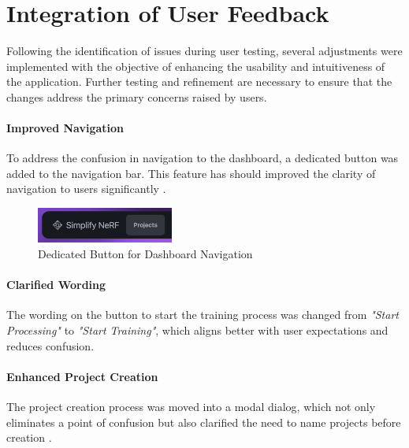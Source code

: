 \section{Integration of User Feedback}
\label{sec:discussion:user-feedback}

Following the identification of issues during user testing, several adjustments were implemented with the objective of enhancing the usability and intuitiveness of the application.
Further testing and refinement are necessary to ensure that the changes address the primary concerns raised by users.

\paragraph{Improved Navigation}
To address the confusion in navigation to the dashboard, a dedicated button was added to the navigation bar.
This feature has should improved the clarity of  navigation to users significantly .

\begin{figure}[htb]
  \centering
	\includegraphics[width=0.4\textwidth]{figures/fix-1.png}
	\caption{Dedicated Button for Dashboard Navigation}
  \label{fig:fix-1}
\end{figure}

\paragraph{Clarified Wording}
The wording on the button to start the training process was changed from \emph{"Start Processing"} to \emph{"Start Training"}, which aligns better with user expectations and reduces confusion.


\paragraph{Enhanced Project Creation}
The project creation process was moved into a modal dialog, which not only eliminates a point of confusion but also clarified the need to name projects before creation .

